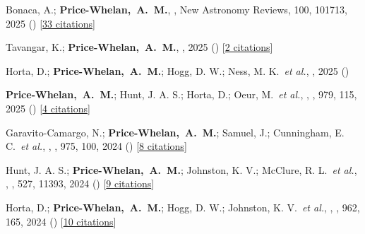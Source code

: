 \item[{\color{deemph}\scriptsize18}]Bonaca, A.; \textbf{Price-Whelan,~A.~M.}, , New Astronomy Reviews, 100, 101713, 2025 () [\href{http://adsabs.harvard.edu/abs/2025NewAR.10001713B}{33 citations}]

\item[{\color{deemph}\scriptsize17}]Tavangar, K.; \textbf{Price-Whelan,~A.~M.}, , 2025 () [\href{http://adsabs.harvard.edu/abs/2025arXiv250213236T}{2 citations}]

\item[{\color{deemph}\scriptsize16}]Horta, D.; \textbf{Price-Whelan,~A.~M.}; Hogg, D. W.; Ness, M. K.~\textit{et al.}, , 2025 ()

\item[{\color{deemph}\scriptsize15}]\textbf{Price-Whelan,~A.~M.}; Hunt, J. A. S.; Horta, D.; Oeur, M.~\textit{et al.}, , \apj, 979, 115, 2025 () [\href{http://adsabs.harvard.edu/abs/2025ApJ...979..115P}{4 citations}]

\item[{\color{deemph}\scriptsize14}]Garavito-Camargo, N.; \textbf{Price-Whelan,~A.~M.}; Samuel, J.; Cunningham, E. C.~\textit{et al.}, , \apj, 975, 100, 2024 () [\href{http://adsabs.harvard.edu/abs/2024ApJ...975..100G}{8 citations}]

\item[{\color{deemph}\scriptsize13}]Hunt, J. A. S.; \textbf{Price-Whelan,~A.~M.}; Johnston, K. V.; McClure, R. L.~\textit{et al.}, , \mnras, 527, 11393, 2024 () [\href{http://adsabs.harvard.edu/abs/2024MNRAS.52711393H}{9 citations}]

\item[{\color{deemph}\scriptsize12}]Horta, D.; \textbf{Price-Whelan,~A.~M.}; Hogg, D. W.; Johnston, K. V.~\textit{et al.}, , \apj, 962, 165, 2024 () [\href{http://adsabs.harvard.edu/abs/2024ApJ...962..165H}{10 citations}]

